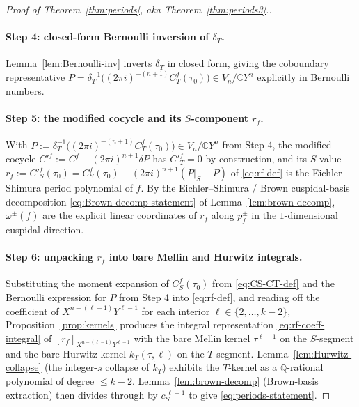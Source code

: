 \documentclass[11pt]{article}
\numberwithin{equation}{section}  %
\newcommand{\QQ}{\mathbb{Q}}
\newcommand{\CC}{\mathbb{C}}
\begin{document}
\begin{proof}[Proof of Theorem~\ref{thm:periods}, aka Theorem~\ref{thm:periods3}.]
\paragraph{Step 4: closed-form Bernoulli inversion of $\delta_T$.}
Lemma~\ref{lem:Bernoulli-inv} inverts $\delta_T$ in closed form, giving
the coboundary representative
$P = \delta_T^{-1}\bigl((2\pi i)^{-(n+1)} C^f_T(\tau_0)\bigr) \in V_n/\CC Y^n$
explicitly in Bernoulli numbers.

\paragraph{Step 5: the modified cocycle and its $S$-component $r_f$.}
With $P := \delta_T^{-1}\bigl((2\pi i)^{-(n + 1)} C^f_T(\tau_0)\bigr) \in
V_n/\CC Y^n$ from Step 4, the modified cocycle
$C'^f := C^f - (2\pi i)^{n + 1}\delta P$ has $C'^f_T = 0$ by construction,
and its $S$-value
$r_f := C'^f_S(\tau_0) = C^f_S(\tau_0) - (2\pi i)^{n + 1}(P|_S - P)$
of \eqref{eq:rf-def} is
the Eichler--Shimura period polynomial of $f$.  By the
Eichler--Shimura / Brown cuspidal-basis decomposition
\eqref{eq:Brown-decomp-statement} of Lemma~\ref{lem:brown-decomp},
$\omega^\pm(f)$ are the explicit linear coordinates of $r_f$ along
$p^\pm_f$ in the $1$-dimensional cuspidal direction.

\paragraph{Step 6: unpacking $r_f$ into bare Mellin and Hurwitz integrals.}
Substituting the moment expansion of $C^f_S(\tau_0)$ from
\eqref{eq:CS-CT-def} and the Bernoulli expression for $P$ from Step 4
into \eqref{eq:rf-def}, and reading off the coefficient of $X^{n - (\ell - 1)}
Y^{\ell - 1}$ for each interior $\ell \in \{2, \ldots, k - 2\}$,
Proposition~\ref{prop:kernels} produces the integral representation
\eqref{eq:rf-coeff-integral} of $[r_f]_{X^{n - (\ell - 1)} Y^{\ell - 1}}$
with the bare Mellin kernel $\tau^{\ell - 1}$ on the $S$-segment and the
bare Hurwitz kernel $\widetilde{k}_T(\tau, \ell)$ on the $T$-segment.
Lemma~\ref{lem:Hurwitz-collapse} (the integer-$s$ collapse of
$\widetilde{k}_T$) exhibits the $T$-kernel as a $\QQ$-rational
polynomial of degree $\le k - 2$.  Lemma~\ref{lem:brown-decomp}
(Brown-basis extraction) then divides through by $c_S^{\,\ell - 1}$ to
give \eqref{eq:periods-statement}.%


\end{proof}
\end{document}
